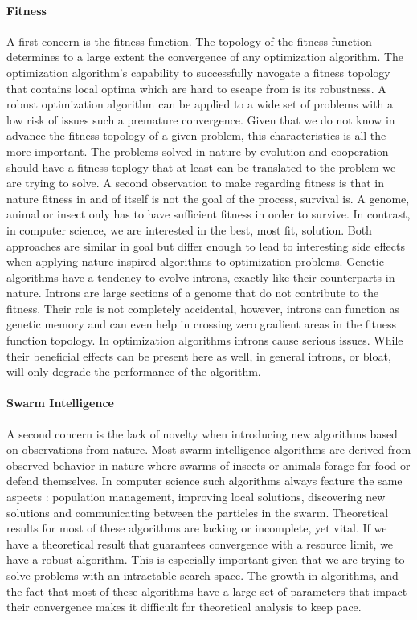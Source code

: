 \paragraph{Fitness}
A first concern is the fitness function. The topology of the fitness function determines to a large extent the convergence of any optimization algorithm. The optimization algorithm's capability to successfully navogate a fitness topology that contains local optima which are hard to escape from is its robustness. A robust optimization algorithm can be applied to a wide set of problems with a low risk of issues such a premature convergence. Given that we do not know in advance the fitness topology of a given problem, this characteristics is all the more important.
The problems solved in nature by evolution and cooperation should have a fitness toplogy that at least can be translated to the problem we are trying to solve. A second observation to make regarding fitness is that in nature fitness in and of itself is not the goal of the process, survival is. A genome, animal or insect only has to have sufficient fitness in order to survive. In contrast, in computer science, we are interested in the best, most fit, solution. Both approaches are similar in goal but differ enough to lead to interesting side effects when applying nature inspired algorithms to optimization problems. Genetic algorithms have a tendency to evolve introns, exactly like their counterparts in nature. Introns are large sections of a genome that do not contribute to the fitness. Their role is not completely accidental, however, introns can function as genetic memory and can even help in crossing zero gradient areas in the fitness function topology. 
In optimization algorithms introns cause serious issues. While their beneficial effects can be present here as well, in general introns, or bloat, will only degrade the performance of the algorithm. 
\paragraph{Swarm Intelligence}
A second concern is the lack of novelty when introducing new algorithms based on observations from nature. Most swarm intelligence algorithms are derived from observed behavior in nature where swarms of insects or animals forage for food or defend themselves. 
In computer science such algorithms always feature the same aspects : population management, improving local solutions, discovering new 
solutions and communicating between the particles in the swarm.
Theoretical results for most of these algorithms are lacking or incomplete, yet vital. If we have a theoretical result that guarantees convergence with a resource limit, we have a robust algorithm. This is especially important given that we are trying to solve problems with an intractable search space. The growth in algorithms, and the fact that most of these algorithms have a large set of parameters that impact their convergence makes it difficult for theoretical analysis to keep pace.

